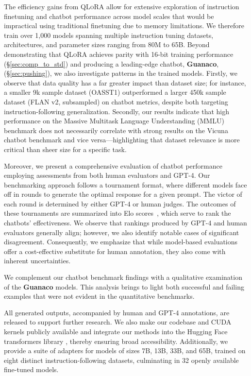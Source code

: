 The efficiency gains from \textsc{QLoRA} allow for extensive exploration of instruction finetuning and chatbot performance across model scales that would be impractical using traditional finetuning due to memory limitations. We therefore train over 1,000 models spanning multiple instruction tuning datasets, architectures, and parameter sizes ranging from 80M to 65B. Beyond demonstrating that \textsc{QLoRA} achieves parity with 16-bit training performance (\S\ref{sec:comp_to_std}) and producing a leading-edge chatbot, \textbf{Guanaco}, (\S\ref{sec:pushing}), we also investigate patterns in the trained models. Firstly, we observe that data quality has a far greater impact than dataset size; for instance, a smaller 9k sample dataset (OASST1) outperformed a larger 450k sample dataset (FLAN v2, subsampled) on chatbot metrics, despite both targeting instruction-following generalization. Secondly, our results indicate that high performance on the Massive Multitask Language Understanding (MMLU) benchmark does not necessarily correlate with strong results on the Vicuna chatbot benchmark and vice versa—highlighting that dataset relevance is more critical than sheer size for a specific task.

Moreover, we present a comprehensive evaluation of chatbot performance employing assessments from both human evaluators and GPT-4. Our benchmarking approach follows a tournament format, where different models face off in rounds to generate the optimal response for a given prompt. The victor of each round is determined by either GPT-4 or human judges. The outcomes of these tournaments are summarized into Elo scores~\citep{elo1967proposed, elo1978rating}, which serve to rank the chatbots' effectiveness. We observe that rankings produced by GPT-4 and human evaluators generally align; however, we also identify notable cases of significant disagreement. Consequently, we emphasize that while model-based evaluations offer a cost-effective substitute for human annotation, they also come with inherent uncertainties.

We complement our chatbot benchmark findings with a qualitative examination of the \textbf{Guanaco} models. This analysis brings to light both successful and failing examples that were not evident in the quantitative benchmarks.

All generated outputs, accompanied by human and GPT-4 annotations, are released to support further research. We also make our codebase and CUDA kernels publicly available and integrate our methods into the Hugging Face transformers library \citep{wolf2019huggingface}, thereby ensuring broad accessibility. Additionally, we provide a suite of adapters for models of sizes 7B, 13B, 33B, and 65B, trained on eight distinct instruction-following datasets, culminating in 32 openly available fine-tuned models.

